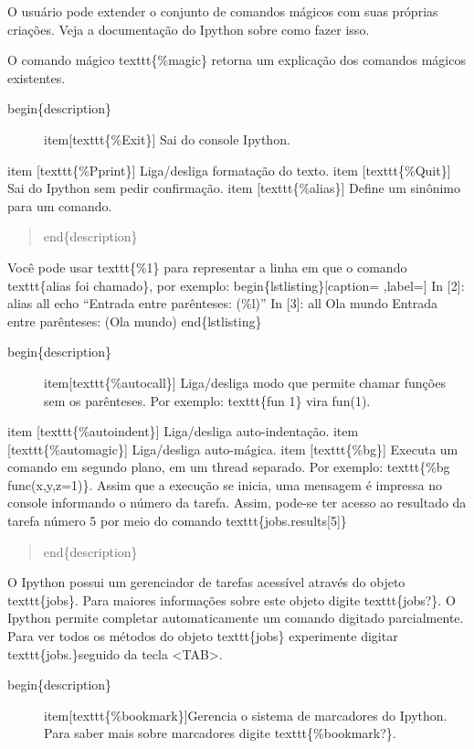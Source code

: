 \documentclass[a4paper,10pt,portuguese]{sphinxmanual}
\begin{document}
O usuário pode extender o conjunto de comandos mágicos com suas próprias criações. Veja a documentação do Ipython sobre como fazer isso.

O comando mágico texttt\{\%magic\} retorna um explicação dos comandos mágicos existentes.
\begin{description}
\item[{begin\{description\}}] \leavevmode
item{[}texttt\{\%Exit\}{]} Sai do console Ipython.

\end{description}

item {[}texttt\{\%Pprint\}{]} Liga/desliga formatação do texto.
item {[}texttt\{\%Quit\}{]} Sai do Ipython sem pedir confirmação.
item {[}texttt\{\%alias\}{]} Define um sinônimo para um comando.
\begin{quote}

end\{description\}
\end{quote}

Você pode usar texttt\{\%1\} para representar a linha em que o comando texttt\{alias foi chamado\}, por exemplo:
begin\{lstlisting\}{[}caption= ,label={]}
In {[}2{]}: alias all echo ``Entrada entre parênteses: (\%l)''
In {[}3{]}: all Ola mundo
Entrada entre parênteses: (Ola mundo)
end\{lstlisting\}
\begin{description}
\item[{begin\{description\}}] \leavevmode
item{[}texttt\{\%autocall\}{]} Liga/desliga modo que permite chamar funções sem os parênteses. Por exemplo: texttt\{fun 1\} vira fun(1).

\end{description}

item {[}texttt\{\%autoindent\}{]} Liga/desliga auto-indentação.
item {[}texttt\{\%automagic\}{]} Liga/desliga auto-mágica.
item {[}texttt\{\%bg\}{]} Executa um comando em segundo plano, em um thread separado. Por exemplo: texttt\{\%bg func(x,y,z=1)\}. Assim que a execução se inicia, uma mensagem é impressa no console informando o número da tarefa. Assim, pode-se ter acesso ao resultado da tarefa número 5 por meio do comando texttt\{jobs.results{[}5{]}\}
\begin{quote}

end\{description\}
\end{quote}

O Ipython possui um gerenciador de tarefas acessível através do objeto texttt\{jobs\}. Para maiores informações sobre este objeto digite texttt\{jobs?\}. O Ipython permite completar automaticamente  um comando digitado parcialmente. Para ver todos os métodos do objeto texttt\{jobs\} experimente digitar texttt\{jobs.\}seguido da tecla \textless{}TAB\textgreater{}.
\begin{description}
\item[{begin\{description\}}] \leavevmode
item{[}texttt\{\%bookmark\}{]}Gerencia o sistema de marcadores do Ipython. Para saber mais sobre marcadores digite texttt\{\%bookmark?\}.

\end{description}
\end{document}
